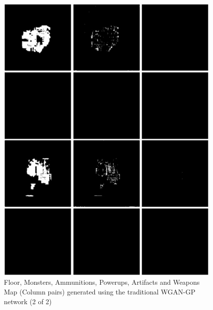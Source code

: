 \documentclass{Configuration_Files/PoliMi3i_thesis}
\begin{document}
\begin{figure}[H]
    \centering
    \includegraphics[width=1\textwidth]{wgan_sample2.jpg}
    \caption[Samples generated using the traditional WGAN-GP architecture (2 of 2)]{Floor, Monsters, Ammunitions, Powerups, Artifacts and Weapons Map 
(Column pairs) generated using the traditional WGAN-GP network (2 of 2)}
    \label{fig:wgansample2}
\end{figure}
\end{document}
